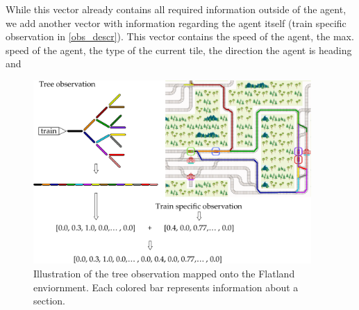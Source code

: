 While this vector already contains all required information outside of the agent, we add another vector with information regarding the agent itself (train specific observation in \autoref{obs_descr}). This vector contains the speed of the agent, the max. speed of the agent, the type of the current tile, the direction the agent is heading and 
\begin{figure}
	\centering
	\includegraphics[width=300pt]{diagrams/tree_obs_mapping.pdf}
	\caption{Illustration of the tree observation mapped onto the Flatland enviornment. Each colored bar represents information about a section.}
	\label{obs_descr}
\end{figure}
